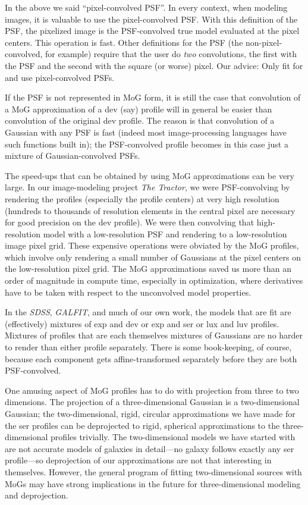 \documentclass[12pt,pdftex,preprint]{aastex}
\newcommand{\project}[1]{\textsl{#1}}
\begin{document}
In the above we said ``pixel-convolved PSF''.  In every context, when
modeling images, it is valuable to use the pixel-convolved PSF.  With
this definition of the PSF, the pixelized image is the PSF-convolved
true model evaluated at the pixel centers.  This operation is fast.
Other definitions for the PSF (the non-pixel-convolved, for example)
require that the user do \emph{two} convolutions, the first with the
PSF and the second with the square (or worse) pixel.  Our advice: Only
fit for and use pixel-convolved PSFs.

If the PSF is not represented in MoG form, it is still the case that
convolution of a MoG approximation of a dev (say) profile will in
general be easier than convolution of the original dev profile.  The
reason is that convolution of a Gaussian with any PSF is fast (indeed
most image-processing languages have such functions built in); the
PSF-convolved profile becomes in this case just a mixture of
Gaussian-convolved PSFs.

The speed-ups that can be obtained by using MoG approximations can be
very large.  In our image-modeling project \project{The Tractor}, we
were PSF-convolving by rendering the profiles (especially the profile
centers) at very high resolution (hundreds to thousands of resolution
elements in the central pixel are necessary for good precision on the
dev profile).  We were then convolving that high-resolution model with
a low-resolution PSF and rendering to a low-resolution image pixel
grid.  These expensive operations were obviated by the MoG profiles,
which involve only rendering a small number of Gaussians at the pixel
centers on the low-resolution pixel grid.  The MoG approximations
saved us more than an order of magnitude in compute time, especially
in optimization, where derivatives have to be taken with respect to
the unconvolved model properties.

In the \project{SDSS}, \project{GALFIT}, and much of our own work, the
models that are fit are (effectively) mixtures of exp and dev or exp
and ser or lux and luv profiles.  Mixtures of profiles that are each
themselves mixtures of Gaussians are no harder to render than either
profile separately.  There is some book-keeping, of course, because
each component gets affine-transformed separately before they are both
PSF-convolved.

One amusing aspect of MoG profiles has to do with projection from
three to two dimensions.  The projection of a three-dimensional
Gaussian is a two-dimensional Gaussian; the two-dimensional, rigid,
circular approximations we have made for the ser profiles can be
deprojected to rigid, spherical approximations to the
three-dimensional profiles trivially.  The two-dimensional models we
have started with are not accurate models of galaxies in detail---no
galaxy follows exactly any ser profile---so deprojection of our
approximations are not that interesting in themselves.  However,
the general program of fitting two-dimensional sources with MoGs may
have strong implications in the future for three-dimensional modeling
and deprojection.
\end{document}
